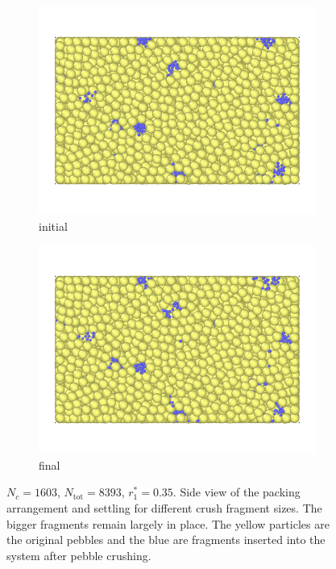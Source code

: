 \begin{figure}[!ht]
	\centering
	\begin{subfigure}[b]{\doubleimagewidth}
		\centering
		\includegraphics[width=\textwidth]{chapters/figures/crush-fragments/0.35-1.png}
		\caption{initial}
	\end{subfigure}
	\begin{subfigure}[b]{\doubleimagewidth}
		\centering
		\includegraphics[width=\textwidth]{chapters/figures/crush-fragments/0.35-2.png}
		\caption{final}
	\end{subfigure}
	\caption{$N_c = 1603$, $N_\text{tot} = 8393$, $r_1^* = 0.35$. Side view of the packing arrangement and settling for different crush fragment sizes. The bigger fragments remain largely in place. The yellow particles are the original pebbles and the blue are fragments inserted into the system after pebble crushing.}
\label{fig:crush-settling-pictures-3}
\end{figure}
